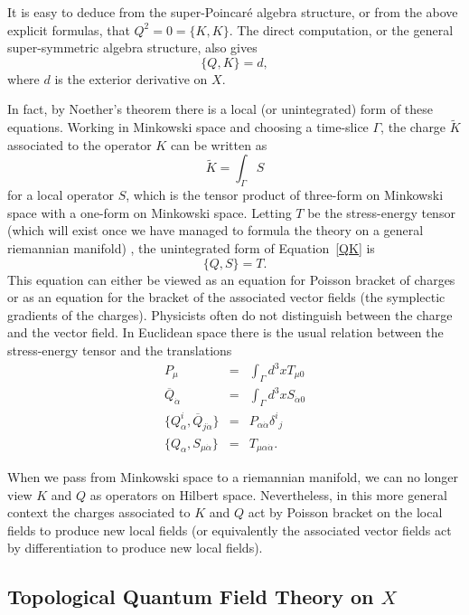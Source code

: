 \documentclass[10pt]{article}
\def\ov{\overline}
\begin{document}
It is easy to deduce from the super-Poincar\'e algebra structure, or
from the above explicit formulas,  that
$Q^2=0=\{K,K\}$. 
The direct computation, or the general super-symmetric algebra
structure, also gives
\begin{equation}\label{QK}
\{Q,K\}=d,
\end{equation}
where $d$ is the exterior derivative on $X$.




In fact, by Noether's theorem  there is a local (or unintegrated) form
of these equations.  
Working in Minkowski space and choosing a time-slice $\Gamma$, the
charge $\tilde K$ associated to the operator
$K$ can be written as
$$\tilde K=\int_\Gamma S$$
for a local operator $S$, which is the tensor product of  three-form
on Minkowski space  with a one-form on Minkowski space.
Letting $T$ be the stress-energy tensor (which will exist once we have
managed to formula the theory on a general riemannian manifold) , the
unintegrated form of 
Equation~\ref{QK} is
$$\{Q,S\}=T.$$
This equation can either be viewed as an equation for Poisson bracket
of charges or as an equation for the bracket  of the associated vector
fields (the symplectic gradients of the charges).
Physicists often do not distinguish between the charge and the vector
field. 
In Euclidean space there is the usual relation between the
stress-energy tensor and the translations
\begin{eqnarray*}
P_\mu & = & \int_\Gamma d^3xT_{\mu 0} \\
\ov{Q}_{\dot\alpha} & = & \int_\Gamma d^3xS_{\dot\alpha 0} \\
\{Q^i_\alpha,\ov{Q}_{j\dot\alpha}\} & = &
P_{\alpha\dot\alpha}\delta^i{}_j \\
\{Q_\alpha,S_{\mu\dot\alpha}\} & = & T_{\mu\alpha\dot\alpha}.
\end{eqnarray*}


When we pass from Minkowski space to a riemannian manifold, we can no
longer view $K$ and $Q$ as operators on Hilbert space. Nevertheless,
in this more general context the charges associated to $K$ and 
$Q$ act by Poisson bracket on the local fields to produce new local
fields (or equivalently the associated vector fields act by
differentiation to produce new local fields). 

\subsection{Topological Quantum Field Theory on $X$}
\end{document}
